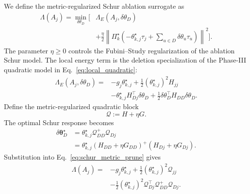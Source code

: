 \documentclass[
  reprint,
  amsmath,
  amssymb,
  aps,
  pra,
  nofootinbib,
  superscriptaddress,
  floatfix
]{revtex4-2}
\begin{document}
We define the metric-regularized Schur ablation surrogate as
\begin{equation}
\begin{aligned}
\Lambda(A_j)
=
\min_{\delta\theta_D}
\Biggl[
&\Lambda_E(A_j,\delta\theta_D)
\\
&+
\frac{\eta}{2}
\left\|
\Pi_k^\star
\left(
-\theta_{k,j}^\star\tau_j
+
\sum_{u\in D}\delta\theta_u\tau_u
\right)
\right\|^2
\Biggr].
\end{aligned}
\label{eq:schur_metric_prune}
\end{equation}
The parameter \(\eta\ge0\) controls the Fubini--Study regularization of the
ablation Schur model.
The local energy term is the deletion specialization of the Phase-III
quadratic model in Eq.~\eqref{eq:local_quadratic}:
\begin{equation*}
\begin{aligned}
\Lambda_E(A_j,\delta\theta_D)
={}&
-g_j\theta_{k,j}^\star
+
\frac12(\theta_{k,j}^\star)^2H_{jj}
\\
&-
\theta_{k,j}^\star H_{Dj}^{\top}\delta\theta_D
+
\frac12\delta\theta_D^{\top}H_{DD}\delta\theta_D .
\end{aligned}
\end{equation*}
Define the metric-regularized quadratic block
\[
\mathcal Q:=H+\eta G .
\]
The optimal Schur response becomes
\begin{equation*}
\begin{aligned}
\delta\boldsymbol\theta_D^\star
&=
\theta_{k,j}^\star
\mathcal Q_{DD}^{+}\mathcal Q_{Dj}
\\
&=
\theta_{k,j}^\star
\left(H_{DD}+\eta G_{DD}\right)^+
\left(H_{Dj}+\eta G_{Dj}\right).
\end{aligned}
\end{equation*}
Substitution into Eq.~\eqref{eq:schur_metric_prune} gives
\begin{equation*}
\begin{aligned}
\Lambda(A_j)
={}&
-g_j\theta_{k,j}^\star
+
\frac12(\theta_{k,j}^\star)^2\mathcal Q_{jj}
\\
&-
\frac12(\theta_{k,j}^\star)^2
\mathcal Q_{Dj}^{\top}
\mathcal Q_{DD}^{+}
\mathcal Q_{Dj}.
\end{aligned}
\end{equation*}
\end{document}
